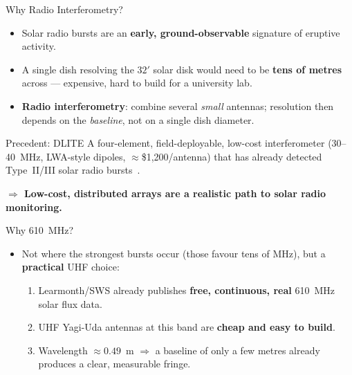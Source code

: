 \documentclass{beamer}
\begin{document}
\begin{frame}{Why Radio Interferometry?}
\begin{itemize}
  \item Solar radio bursts are an \textbf{early, ground-observable} signature of eruptive activity.
  \item A single dish resolving the $32'$ solar disk would need to be
  \textbf{tens of metres} across --- expensive, hard to build for a university lab.
  \item \textbf{Radio interferometry}: combine several \emph{small} antennas;
  resolution then depends on the \emph{baseline}, not on a single dish diameter.
\end{itemize}
\vspace{0.4em}
\begin{block}{Precedent: DLITE}
A four-element, field-deployable, low-cost interferometer
(30--40~MHz, LWA-style dipoles, $\approx$\$1{,}200/antenna) that has
already detected Type~II/III solar radio bursts~\cite{carson2022dlite,lwa_pricing}.
\end{block}
\centering
\textbf{$\Rightarrow$ Low-cost, distributed arrays are a realistic path to solar radio monitoring.}
\end{frame}

\begin{frame}{Why 610~MHz?}
\begin{itemize}
  \item Not where the strongest bursts occur (those favour tens of MHz), but a
  \textbf{practical} UHF choice:
  \begin{enumerate}
    \item Learmonth/SWS already publishes \textbf{free, continuous, real} 610~MHz
    solar flux data.
    \item UHF Yagi-Uda antennas at this band are \textbf{cheap and easy to build}.
    \item Wavelength $\approx 0.49$~m $\Rightarrow$ a baseline of only a few metres
    already produces a clear, measurable fringe.
  \end{enumerate}
\end{itemize}
\end{frame}
\end{document}

